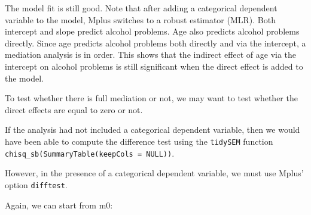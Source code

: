 \documentclass[
]{book}
\begin{document}
The model fit is still good. Note that after adding a categorical dependent variable to the
model, Mplus switches to a robust estimator (MLR). Both intercept and slope predict alcohol problems. Age also predicts alcohol problems directly. Since age
predicts alcohol problems both directly and via the intercept, a mediation analysis is in
order. This shows that the indirect effect of age via the intercept on alcohol problems is still
significant when the direct effect is added to the model.

To test whether there is full mediation or not, we may want to test whether the direct
effects are equal to zero or not.

If the analysis had not included a categorical dependent variable,
then we would have been able to compute the difference test using the \texttt{tidySEM}
function \texttt{chisq\_sb(SummaryTable(keepCols\ =\ NULL))}.

However, in the presence of a categorical dependent variable, we must use Mplus'
option \texttt{difftest}.

Again, we can start from m0:
\end{document}
